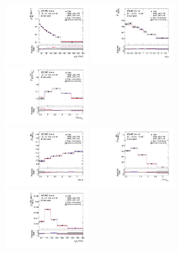 \begin{figure}[ht]
  \centering
  \includegraphics[width=0.33\textwidth]{figures/diff_xsec/normalized-unfolded-distributions/tty_prod_ljet/SL_tty_prod_pt_unfolded_normalized.pdf}%
  \includegraphics[width=0.33\textwidth]{figures/diff_xsec/normalized-unfolded-distributions/tty_prod_ljet/SL_tty_prod_eta_unfolded_normalized.pdf}%
  \includegraphics[width=0.33\textwidth]{figures/diff_xsec/normalized-unfolded-distributions/tty_prod_ljet/SL_tty_prod_drphb_unfolded_normalized.pdf}\\
  \includegraphics[width=0.33\textwidth]{figures/diff_xsec/normalized-unfolded-distributions/tty_prod_ljet/SL_tty_prod_drphl_unfolded_normalized.pdf}%
  \includegraphics[width=0.33\textwidth]{figures/diff_xsec/normalized-unfolded-distributions/tty_prod_ljet/SL_tty_prod_drlj_unfolded_normalized.pdf}%
  \includegraphics[width=0.33\textwidth]{figures/diff_xsec/normalized-unfolded-distributions/tty_prod_ljet/SL_tty_prod_ptj1_unfolded_normalized.pdf}%

\end{figure}
